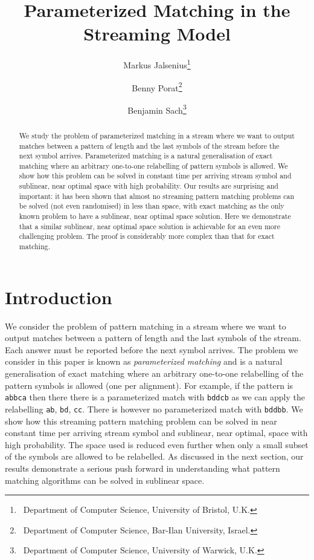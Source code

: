 \documentclass[11pt,a4paper]{article}
\title{Parameterized Matching in the Streaming Model}
\author{
    Markus Jalsenius\thanks{~Department of Computer Science, University of Bristol,  U.K.} \and
    Benny Porat\thanks{~Department of Computer Science, Bar-Ilan University, Israel.}\and
    Benjamin Sach\thanks{~Department of Computer Science, University of Warwick, U.K.}}
\date{}
\theoremstyle{theorem}
\begin{document}
\maketitle

\begin{abstract}

We study the problem of parameterized matching in a stream where we want to output matches between a pattern of length  and the last  symbols of the stream before the next symbol arrives. Parameterized matching is a natural generalisation of exact matching where an arbitrary one-to-one relabelling of pattern symbols is allowed. We show how this problem can be solved in constant time per arriving stream symbol and sublinear, near optimal space with high probability. Our results are surprising and important: it has been shown that almost no streaming pattern matching problems can be solved (not even randomised) in less than  space, with exact matching as the only known problem to have a sublinear, near optimal space solution. Here we demonstrate that a similar sublinear, near optimal space solution is achievable for an even more challenging problem. The proof is considerably more complex than that for exact matching.
 \end{abstract}

\section{Introduction}

We consider the problem of pattern matching in a stream where we want to output matches between a pattern of length  and the last  symbols of the stream. Each answer must be reported before the next symbol arrives. The problem we consider in this paper is known as \emph{parameterized matching} and is a natural generalisation of exact matching where an arbitrary one-to-one relabelling of the pattern symbols is allowed (one per alignment). For example, if the pattern is \texttt{abbca} then there there is a parameterized match with \texttt{bddcb} as we can apply the relabelling \texttt{a}\texttt{b}, \texttt{b}\texttt{d}, \texttt{c}\texttt{c}. There is however no parameterized match with \texttt{bddbb}. We show how this streaming pattern matching problem can be solved in near constant time per arriving stream symbol and sublinear, near optimal, space with high probability. The space used is reduced even further when only a small subset of the symbols are allowed to be relabelled.  As discussed in the next section, our results demonstrate a serious push forward in understanding what pattern matching algorithms can be solved in sublinear space.
\end{document}
